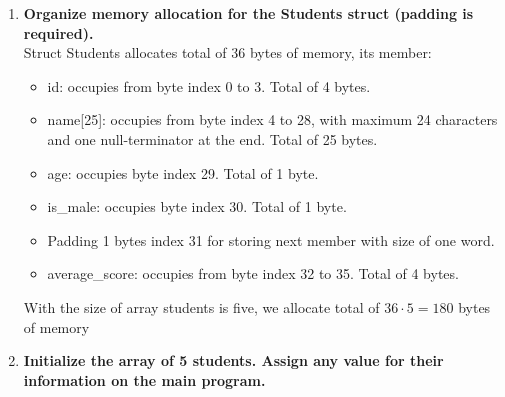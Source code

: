 \documentclass[12pt,a4paper]{article}
\begin{document}
\begin{enumerate}
  \newpage
  \item \textbf{Organize memory allocation for the \textbf{Students struct} (padding is required).} \\

        Struct Students allocates total of 36 bytes of memory, its member:
        \begin{itemize}
          \item id: occupies from byte index 0 to 3. Total of 4 bytes.
          \item name[25]: occupies from byte index 4 to 28, with maximum 24 characters and one null-terminator at the end. Total of 25 bytes.
          \item age: occupies byte index 29. Total of 1 byte.
          \item is\_male: occupies byte index 30. Total of 1 byte.
          \item Padding 1 bytes index 31 for storing next member with size of one word.
          \item average\_score: occupies from byte index 32 to 35. Total of 4 bytes.
        \end{itemize}

        With the size of array students is five, we allocate total of \(36 \cdot 5 = 180\) bytes of memory

  \item \textbf{Initialize the array of 5 students. Assign any value for their information on the main program.} \\


\end{enumerate}
\end{document}
